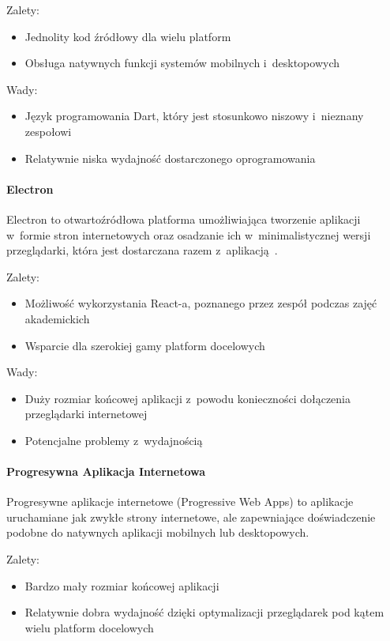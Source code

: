 Zalety:
\begin{itemize}
    \item Jednolity kod źródłowy dla wielu platform
    \item Obsługa natywnych funkcji systemów mobilnych i~desktopowych
\end{itemize}

Wady:
\begin{itemize}
    \item Język programowania Dart, który jest stosunkowo niszowy i~nieznany zespołowi
    \item Relatywnie niska wydajność dostarczonego oprogramowania\cite{flutter-perf}
\end{itemize}

\paragraph{Electron}
Electron to otwartoźródłowa platforma umożliwiająca tworzenie aplikacji w~formie stron internetowych oraz osadzanie ich w~minimalistycznej wersji przeglądarki, która jest dostarczana razem z~aplikacją~\cite{electron-in-action}.

Zalety:
\begin{itemize}
    \item Możliwość wykorzystania React-a, poznanego przez zespół podczas zajęć akademickich
    \item Wsparcie dla szerokiej gamy platform docelowych
\end{itemize}

Wady:
\begin{itemize}
    \item Duży rozmiar końcowej aplikacji z~powodu konieczności dołączenia przeglądarki internetowej
    \item Potencjalne problemy z~wydajnością
\end{itemize}

\paragraph{Progresywna Aplikacja Internetowa}
Progresywne aplikacje internetowe (Progressive Web Apps) to aplikacje uruchamiane jak zwykłe strony internetowe, ale zapewniające doświadczenie podobne do natywnych aplikacji mobilnych lub desktopowych.\cite{pwa-book}

Zalety:
\begin{itemize}
    \item Bardzo mały rozmiar końcowej aplikacji
    \item Relatywnie dobra wydajność dzięki optymalizacji przeglądarek pod kątem wielu platform docelowych
\end{itemize}

